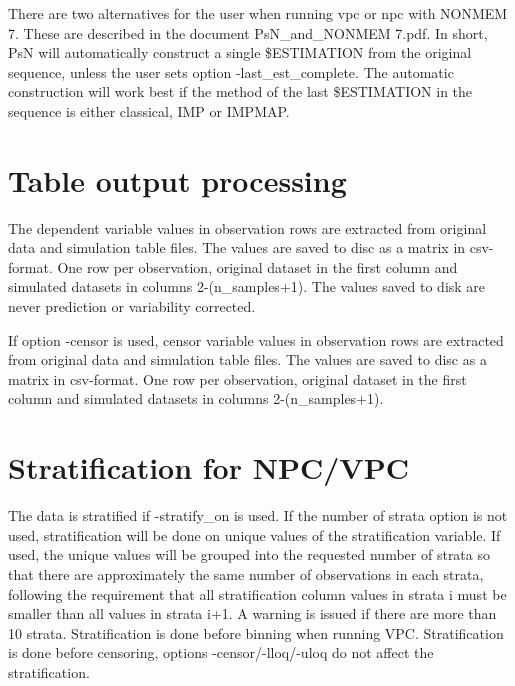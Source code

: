 There are two alternatives for the user when running vpc or npc with NONMEM 7. These are described in the document PsN\_and\_NONMEM 7.pdf. In short, PsN will automatically construct a single \$ESTIMATION from the original sequence, unless the user sets option -last\_est\_complete. The automatic construction will work best if the method of the last \$ESTIMATION in the sequence is either classical, IMP or IMPMAP.

\section{Table output processing}
The dependent variable values in observation rows are extracted from original data and simulation table files. The values are saved to disc as a matrix in csv-format. One row per observation, original dataset in the first column and simulated datasets in columns 2-(n\_samples+1). The values saved to disk are never prediction or variability corrected.

If option -censor is used, censor variable values in observation rows are extracted from original data and simulation table files. The values are saved to disc as a matrix in csv-format. One row per observation, original dataset in the first column and simulated datasets in columns 2-(n\_samples+1).

\section{Stratification for NPC/VPC}
The data is stratified if -stratify\_on is used. If the number of strata option is not used, stratification will be done on unique values of the stratification variable. If used, the unique values will be grouped into the requested number of strata so that there are approximately the same number of observations in each strata, following the requirement that all stratification column values in strata i must be smaller than all values in strata i+1. A warning is issued if there are more than 10 strata. Stratification is done before binning when running VPC. Stratification is done before censoring, options -censor/-lloq/-uloq do not affect the stratification.


